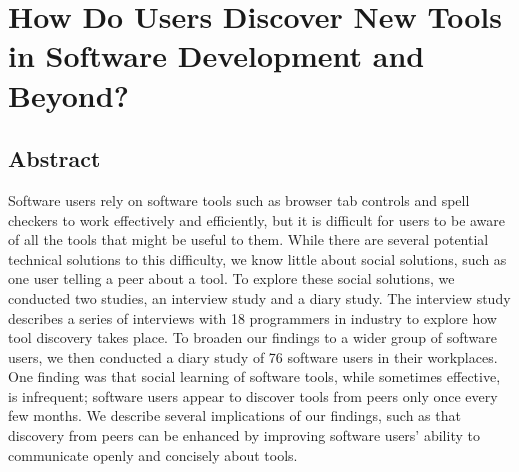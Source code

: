 
\section{How Do Users Discover New Tools in Software Development and Beyond?}

\subsection{Abstract}

Software users rely on software tools such as browser tab controls and spell checkers to work effectively and efficiently, but it is difficult for users to be aware of all the tools that might be useful to them. While there are several potential technical solutions to this difficulty, we know little about social solutions, such as one user telling a peer about a tool. To explore these social solutions, we conducted two studies, an interview study and a diary study. The interview study describes a series of interviews with 18 programmers in industry to explore how tool discovery takes place. To broaden our findings to a wider group of software users, we then conducted a diary study of 76 software users in their workplaces. One finding was that social learning of software tools, while sometimes effective, is infrequent; software users appear to discover tools from peers only once every few months. We describe several implications of our findings, such as that discovery from peers can be enhanced by improving software users’ ability to communicate openly and concisely about tools.
